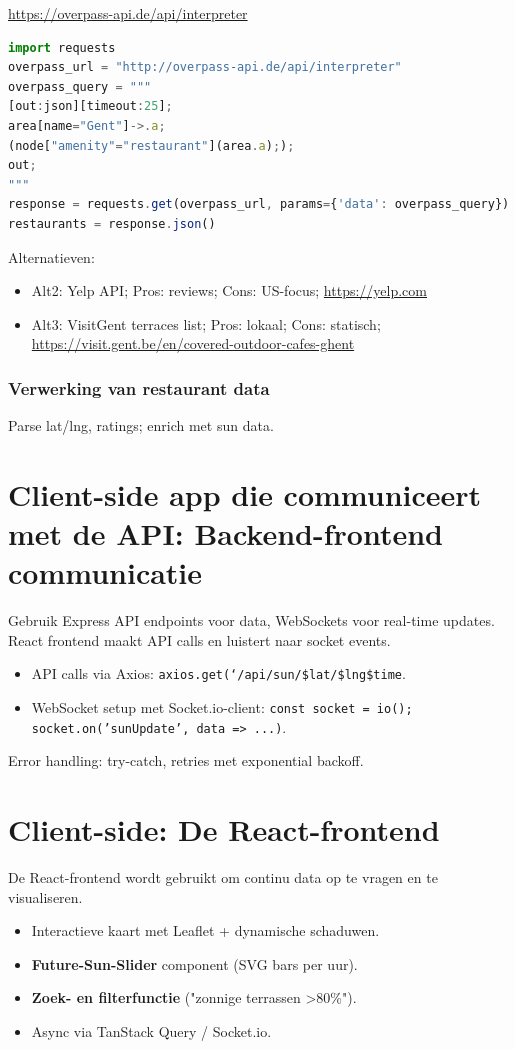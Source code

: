 \documentclass{article}
\begin{document}
\url{https://overpass-api.de/api/interpreter}

\begin{lstlisting}[language=JavaScript]
import requests
overpass_url = "http://overpass-api.de/api/interpreter"
overpass_query = """
[out:json][timeout:25];
area[name="Gent"]->.a;
(node["amenity"="restaurant"](area.a););
out;
"""
response = requests.get(overpass_url, params={'data': overpass_query})
restaurants = response.json()
\end{lstlisting}

Alternatieven:
\begin{itemize}
    \item Alt2: Yelp API; Pros: reviews; Cons: US-focus; \url{https://yelp.com}\cite{web:23}
    \item Alt3: VisitGent terraces list; Pros: lokaal; Cons: statisch; \url{https://visit.gent.be/en/covered-outdoor-cafes-ghent}\cite{web:22}
\end{itemize}

\subsubsection{Verwerking van restaurant data}
Parse lat/lng, ratings; enrich met sun data.

\section{Client-side app die communiceert met de API: Backend-frontend communicatie}
Gebruik Express API endpoints voor data, WebSockets voor real-time updates. React frontend maakt API calls en luistert naar socket events.
\begin{itemize}
    \item API calls via Axios: \texttt{axios.get(`/api/sun/\${lat}/\${lng}\${time}}.
    \item WebSocket setup met Socket.io-client: \texttt{const socket = io(); socket.on('sunUpdate', data => ...)}.
\end{itemize}

Error handling: try-catch, retries met exponential backoff.

\section{Client-side: De React-frontend}
De React-frontend wordt gebruikt om continu data op te vragen en te visualiseren.
\begin{itemize}
    \item Interactieve kaart met Leaflet + dynamische schaduwen.
    \item \textbf{Future-Sun-Slider} component (SVG bars per uur).
    \item \textbf{Zoek- en filterfunctie} ("zonnige terrassen >80\%").
    \item Async via TanStack Query / Socket.io.
\end{itemize}
\end{document}
